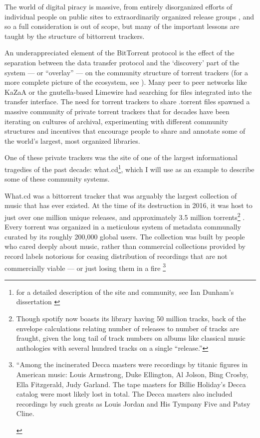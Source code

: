 \documentclass[10pt]{article}
\begin{document}
\begin{multicols}{2}
The world of digital piracy is massive, from entirely disorganized
efforts of individual people on public sites to extraordinarily
organized release groups \cite{basamanowiczReleaseGroupsDigital2011} , and so a full consideration is out of scope, but many of the
important lessons are taught by the structure of bittorrent trackers.

An underappreciated element of the BitTorrent protocol is the effect of
the separation between the data transfer protocol and the `discovery'
part of the system --- or ``overlay'' --- on the community structure of
torrent trackers (for a more complete picture of the ecosystem, see \cite{zhangUnravelingBitTorrentEcosystem2011} ). Many peer to peer
networks like KaZaA or the gnutella-based Limewire had searching for
files integrated into the transfer interface. The need for torrent
trackers to share .torrent files spawned a massive community of private
torrent trackers that for decades have been iterating on cultures of
archival, experimenting with different community structures and
incentives that encourage people to share and annotate some of the
world's largest, most organized libraries.

One of these private trackers was the site of one of the largest
informational tragedies of the past decade: what.cd\footnote{for a
  detailed description of the site and community, see Ian Dunham's
  dissertation \cite{dunhamWhatCDLegacy2018} }, which I will use
as an example to describe some of these community systems.

What.cd was a bittorrent tracker that was arguably the largest
collection of music that has ever existed. At the time of its
destruction in 2016, it was host to just over one million unique
releases, and approximately 3.5 million torrents\footnote{Though spotify
  now boasts its library having 50 million tracks, back of the envelope
  calculations relating number of releases to number of tracks are
  fraught, given the long tail of track numbers on albums like classical
  music anthologies with several hundred tracks on a single ``release.''}
\cite{dunhamWhatCDLegacy2018} . Every torrent was organized in a
meticulous system of metadata communally curated by its roughly 200,000
global users. The collection was built by people who cared deeply about
music, rather than commercial collections provided by record labels
notorious for ceasing distribution of recordings that are not
commercially viable --- or just losing them in a fire \cite{rosenDayMusicBurned2019} \footnote{\begin{leftbar}
  ``Among the incinerated Decca masters were recordings by titanic
  figures in American music: Louis Armstrong, Duke Ellington, Al Jolson,
  Bing Crosby, Ella Fitzgerald, Judy Garland. The tape masters for
  Billie Holiday's Decca catalog were most likely lost in total. The
  Decca masters also included recordings by such greats as Louis Jordan
  and His Tympany Five and Patsy Cline.


\end{leftbar}}
\end{multicols}
\end{document}

